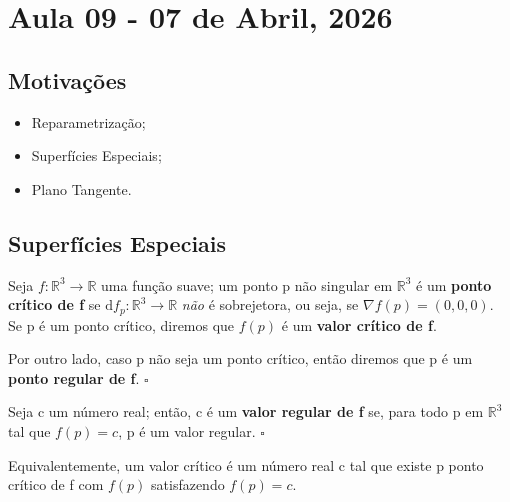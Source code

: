 \documentclass[../differential_geometry.tex]{subfiles}
\begin{document}
\section{Aula 09 - 07 de Abril, 2026}
\subsection{Motivações}
\begin{itemize}
	\item Reparametrização;
	\item Superfícies Especiais;
	\item Plano Tangente.
\end{itemize}
\subsection{Superfícies Especiais}
\begin{def*}
	Seja \(f:\mathbb{R}^{3}\rightarrow \mathbb{R}\) uma função suave; um ponto p não singular em \(\mathbb{R}^{3}\) é um \textbf{ponto crítico de f} se \(\mathrm{d}f_{p}:\mathbb{R}^{3}\rightarrow \mathbb{R}\) \textit{não} é sobrejetora, ou seja, se \(\nabla f(p)=(0,0,0)\).
	Se p é um ponto crítico, diremos que \(f(p)\) é um \textbf{valor crítico de f}.

	Por outro lado, caso p não seja um ponto crítico, então diremos que p é um \textbf{ponto regular de f}. \(\square\)
\end{def*}
\begin{def*}
	Seja c um número real; então, c é um \textbf{valor regular de f} se, para todo p em \(\mathbb{R}^{3}\) tal que \(f(p)=c\), p é um valor regular. \(\square\)
\end{def*}
Equivalentemente, um valor crítico é um número real c tal que existe p ponto crítico de f com \(f(p)\) satisfazendo \(f(p)=c\).
\end{document}
